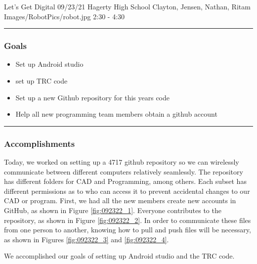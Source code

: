 \insertmeeting 
	{Let's Get Digital} 
	{09/23/21}
	{Hagerty High School}
	{Clayton, Jensen, Nathan, Ritam}
	{Images/RobotPics/robot.jpg}
	{2:30 - 4:30}
	
\noindent\hfil\rule{\textwidth}{.4pt}\hfil
\subsubsection*{Goals}
\begin{itemize}
    \item Set up Android studio
    \item set up TRC code   
    \item Set up a new Github repository for this years code
    \item Help all new programming team members obtain a github account 
\end{itemize} 

\noindent\hfil\rule{\textwidth}{.4pt}\hfil

\subsubsection*{Accomplishments}
Today, we worked on setting up a 4717 github repository so we can wirelessly communicate between different computers relatively seamlessly. The repository has different folders for CAD and Programming, among others. Each subset has different permissions as to who can access it to prevent accidental changes to our CAD or program. First, we had all the new members create new accounts in GitHub, as shown in Figure \ref{fig:092322_1}. Everyone contributes to the repository, as shown in Figure \ref{fig:092322_2}. In order to communicate these files from one person to another, knowing how to pull and push files will be necessary, as shown in Figures \ref{fig:092322_3} and \ref{fig:092322_4}. 
 
We accomplished our goals of setting up Android studio and the TRC code.
 

